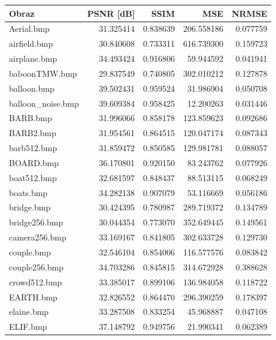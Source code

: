 \documentclass{article}
\begin{document}
\begin{table}[ht]
\centering
\begin{tabular}{@{}lrrrr@{}}

\toprule
             Obraz &  PSNR [dB] &      SSIM &         MSE &     NRMSE \\
\midrule
        Aerial.bmp &  31.325414 &  0.838639 &  206.558186 &  0.077759 \\
      airfield.bmp &  30.840608 &  0.733311 &  616.739300 &  0.159723 \\
      airplane.bmp &  34.493424 &  0.916806 &   59.944592 &  0.041941 \\
     baboonTMW.bmp &  29.837549 &  0.740805 &  302.010212 &  0.127878 \\
       balloon.bmp &  39.502431 &  0.959524 &   31.986904 &  0.050708 \\
 balloon\_noise.bmp &  39.609384 &  0.958425 &   12.200263 &  0.031446 \\
          BARB.bmp &  31.996066 &  0.858178 &  123.859623 &  0.092686 \\
         BARB2.bmp &  31.954561 &  0.864515 &  120.047174 &  0.087343 \\
       barb512.bmp &  31.859472 &  0.850585 &  129.981781 &  0.088057 \\
         BOARD.bmp &  36.170801 &  0.920150 &   83.243762 &  0.077926 \\
       boat512.bmp &  32.681597 &  0.848437 &   88.513115 &  0.068249 \\
         boats.bmp &  34.282138 &  0.907079 &   53.116669 &  0.056186 \\
        bridge.bmp &  30.424395 &  0.780987 &  289.719372 &  0.134789 \\
     bridge256.bmp &  30.044354 &  0.773070 &  352.649445 &  0.149561 \\
     camera256.bmp &  33.169167 &  0.841805 &  302.633728 &  0.129730 \\
        couple.bmp &  32.546104 &  0.854006 &  116.577576 &  0.083842 \\
     couple256.bmp &  34.703286 &  0.845815 &  314.672928 &  0.388628 \\
      crowd512.bmp &  33.385017 &  0.899106 &  136.984058 &  0.118722 \\
         EARTH.bmp &  32.826552 &  0.864470 &  296.390259 &  0.178397 \\
        elaine.bmp &  33.287508 &  0.833254 &   45.968887 &  0.047108 \\
          ELIF.bmp &  37.148792 &  0.949756 &   21.990341 &  0.062389 \\

\end{tabular}
\end{table}
\end{document}
